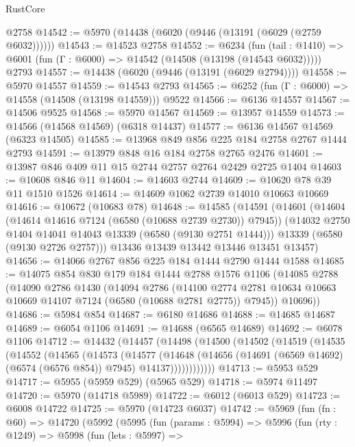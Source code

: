 \begin{lexlean}{RustCore}
\begin{coremodule}
    @2758
@14542 := @5970 (@14438 (@6020 (@9446 (@13191 (@6029 (@2759 @6032))))))
@14543 := @14523 @2758
@14552 := @6234
    (fun (tail : @1410) => @6001 (fun (Γ : @6000) => @14542 (@14508 (@13198 (@14543 @6032)))))
    @2793
@14557 := @14438 (@6020 (@9446 (@13191 (@6029 @2794))))
@14558 := @5970 @14557
@14559 := @14543 @2793
@14565 := @6252 (fun (Γ : @6000) => @14558 (@14508 (@13198 @14559))) @9522
@14566 := @6136 @14557
@14567 := @14506 @9525
@14568 := @5970 @14567
@14569 := @13957 @14559
@14573 := @14566 (@14568 @14569) (@6318 @14437)
@14577 := @6136 @14567 @14569 (@6323 @14505)
@14585 := @13968 @849 @856 @225 @184 @2758 @2767 @1444 @2793
@14591 := @13979 @848 @16 @184 @2758 @2765 @2476
@14601 := @13987 @846 @409 @11 @15 @2744 @2757 @2764 @2429 @2725 @1404
@14603 := @10608 @846 @11
@14604 := @14603 @2744
@14609 := @10620 @78 @39 @11 @1510 @1526
@14614 := @14609 @1062 @2739 @14010 @10663 @10669
@14616 := @10672 (@10683 @78)
@14648 := @14585
    (@14591
      (@14601
        (@14604 (@14614 @14616 @7124 (@6580 (@10688 @2739 @2730)) @7945))
        (@14032 @2750 @1404 @14041 @14043 @13339 (@6580 (@9130 @2751 @1444)))
        @13339
        (@6580 (@9130 @2726 @2757)))
      @13436
      @13439
      @13442
      @13446
      @13451
      @13457)
@14656 := @14066 @2767 @856 @225 @184 @1444 @2790 @1444 @1588
@14685 := @14075
    @854
    @830
    @179
    @184
    @1444
    @2788
    @1576
    @1106
    (@14085
      @2788
      (@14090
        @2786
        @1430
        (@14094
          @2786
          (@14100 @2774 @2781 @10634 @10663 @10669 @14107 @7124 (@6580 (@10688 @2781 @2775)) @7945))
        @10696))
@14686 := @5984 @854
@14687 := @6180 @14686
@14688 := @14685 @14687
@14689 := @6054 @1106
@14691 := @14688 (@6565 @14689)
@14692 := @6078 @1106
@14712 := @14432
    (@14457
      (@14498
        (@14500
          (@14502
            (@14519
              (@14535
                (@14552
                  (@14565
                    (@14573
                      (@14577
                        (@14648
                          (@14656
                            (@14691 (@6569 @14692) (@6574 (@6576 @854)) @7945)
                            @14137))))))))))))
@14713 := @5953 @529
@14717 := @5955 (@5959 @529) (@5965 @529)
@14718 := @5974 @11497
@14720 := @5970 (@14718 @5989)
@14722 := @6012 (@6013 @529)
@14723 := @6008 @14722
@14725 := @5970 (@14723 @6037)
@14742 := @5969
    (fun (fn : @60) =>
    @14720
      (@5992
        (@5995
          (fun (params : @5994) =>
          @5996
            (fun (rty : @1249) =>
            @5998
              (fun (lets : @5997) =>

\end{coremodule}
\end{lexlean}
